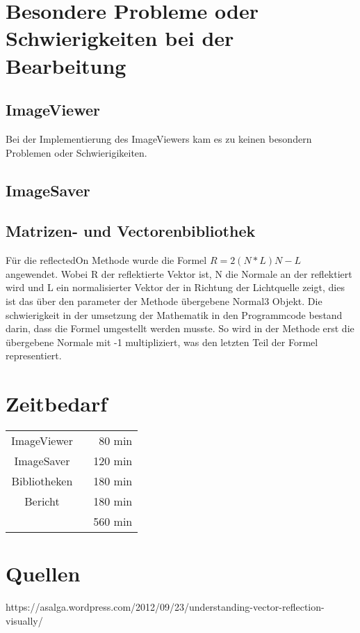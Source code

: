 \documentclass[14pt]{extarticle}
\begin{document}
\section{Besondere Probleme oder Schwierigkeiten bei der Bearbeitung}
\subsection{ImageViewer}
Bei der Implementierung des ImageViewers kam es zu keinen besondern Problemen oder Schwierigikeiten.
\subsection{ImageSaver}
\subsection{Matrizen- und Vectorenbibliothek}
Für die reflectedOn Methode wurde die Formel 
\begin{math} R=2(N*L)N-L \end{math}
angewendet.  Wobei R der reflektierte Vektor ist, N die Normale an der reflektiert wird und L ein normalisierter Vektor der in Richtung der Lichtquelle zeigt, dies ist das über den parameter der Methode übergebene Normal3 Objekt. Die schwierigkeit in der umsetzung der Mathematik in den Programmcode bestand darin, dass die Formel umgestellt werden musste. So wird in der Methode erst die übergebene Normale mit -1 multipliziert, was den letzten Teil der Formel representiert. 

\section{Zeitbedarf}
\begin{center}
\begin{tabular}{cr}
ImageViewer	  \	&80 min	\\
ImageSaver 	\	&120 min	\\
Bibliotheken \	&180 min	\\
Bericht  \		&180 min	 \\
	\hline
	&560 min
\end{tabular}
\end{center}

\section{Quellen}
https://asalga.wordpress.com/2012/09/23/understanding-vector-reflection-visually/
\end{document}
